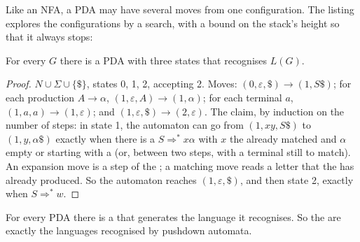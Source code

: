 Like an NFA, a PDA may have several moves from one configuration. The listing explores the configurations by a search,
with a bound on the stack's height so that it always stops:

\label{lst:b2:context-free-languages:pda}

\label{out:b2:context-free-languages:pda}

\begin{theorem}\label{thm:b2:context-free-languages:cfg-to-pda}
For every  $G$ there is a PDA with three states that recognises $L(G)$.
\end{theorem}

\begin{proof}
 $N \cup \Sigma \cup \{\$\}$, states 0, 1, 2, accepting 2. Moves: $(0, \varepsilon, \$) \to (1, S\$)$;
for each production $A \to \alpha$, $(1, \varepsilon, A) \to (1, \alpha)$; for each terminal $a$, $(1, a, a) \to (1,
\varepsilon)$; and $(1, \varepsilon, \$) \to (2, \varepsilon)$. The claim, by induction on the number of steps: in
state 1, the automaton can go from $(1, xy, S\$)$ to $(1, y, \alpha\$)$ exactly when there is a  $S
\Rightarrow^* x\alpha$ with $x$ the  already matched and $\alpha$ empty or starting with a  (or,
between two steps, with a terminal still to match). An expansion move is a step of the ; a matching move
reads a letter that the  has already produced. So the automaton reaches $(1, \varepsilon, \$)$, and then
state 2, exactly when $S \Rightarrow^* w$.
\end{proof}

\begin{theorem}\label{thm:b2:context-free-languages:pda-to-cfg}
For every PDA there is a  that generates the language it recognises. So the 
are exactly the languages recognised by pushdown automata.
\end{theorem}

